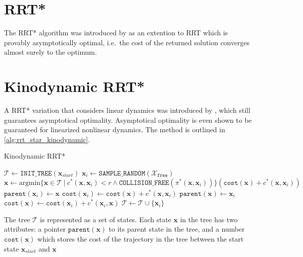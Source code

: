 \section{RRT*}

The RRT* algorithm was introduced by \parencite{sertac2011} as an extention to RRT which is provably asymptotically optimal, i.e.\ the cost of the returned solution converges almost surely to the optimum. 


\section{Kinodynamic RRT*}

A RRT* variation that considers linear dynamics was introduced by \parencite{webb2013}, which still guarantees asymptotical optimality. Asymptotical optimality is even shown to be guaranteed for linearized nonlinear dynamics. The method is outlined in \autoref{alg:rrt_star_kinodynamic}.

\begin{algorithm}
\caption{Kinodynamic RRT*}\label{alg:rrt_star_kinodynamic}
\begin{algorithmic}[1]
\State $\mathcal{T} \gets \mathtt{INIT\_TREE}(\textbf{x}_ {start})$
\State $\textbf{x}_ {i} \gets \mathtt{SAMPLE\_RANDOM(\mathcal{X}_{free} )}$
\State $\textbf{x} \gets \text{argmin} \{\textbf{x} \in \mathcal{T} \ |\ c^*(\textbf{x}, \textbf{x}_i) < r \land \mathtt{COLLISION\_FREE}(\pi^*(\textbf{x},\textbf{x}_i))\}  (\mathtt{cost}(\textbf{x}) + c^*(\textbf{x},\textbf{x}_i))$
\State $\mathtt{parent}(\textbf{x}_i) \gets \textbf{x}$
\State $\mathtt{cost}(\textbf{x}_i) \gets \mathtt{cost}(\textbf{x}) + c^*(\textbf{x},\textbf{x}_i)$
\State $\mathtt{parent}(\textbf{x}) \gets \textbf{x}_i$
\State $\mathtt{cost}(\textbf{x}) \gets \mathtt{cost}(\textbf{x}_i) + c^*(\textbf{x}_i,\textbf{x})$
\EndFor
\State $\mathcal{T} \gets \mathcal{T} \cup \{ \textbf{x}_i \}$
\EndFor
\EndProcedure
\end{algorithmic}
\end{algorithm}

The tree $\mathcal{T}$ is represented as a set of states. Each state $\textbf{x}$ in the tree has two attributes: a pointer $\mathtt{parent}(\textbf{x})$ to its parent state in the tree, and a number $\mathtt{cost}(\textbf{x})$ which stores the cost of the trajectory in the tree between the start state $\textbf{x}_{start}$ and $\textbf{x}$

